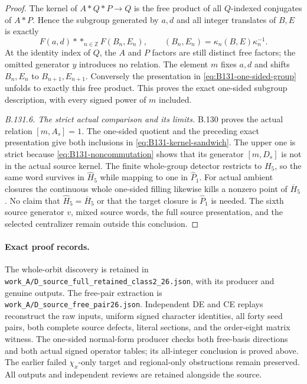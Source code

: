 \begin{proof}
The kernel of $A*Q*P\to Q$ is the free product of all $Q$-indexed
conjugates of $A*P$. Hence the subgroup generated by $a,d$ and all
integer translates of $B,E$ is exactly
\[
 F(a,d)*\mathop{*}_{n\in\mathbb Z}F(B_n,E_n),\qquad
 (B_n,E_n)=\kappa_n(B,E)\kappa_n^{-1}.
\]
At the identity index of $Q$, the $A$ and $P$ factors are still distinct free factors;
the omitted generator $y$ introduces no relation. The element $m$
fixes $a,d$ and shifts $B_n,E_n$ to $B_{n+1},E_{n+1}$. Conversely the
presentation in \eqref{eq:B131-one-sided-group} unfolds to exactly this
free product. This proves the exact one-sided subgroup description,
with every signed power of $m$ included.

\emph{B.131.6. The strict actual comparison and its limits.}
B.130 proves the actual relation $[m,A_s]=1$. The one-sided quotient
and the preceding exact presentation give both inclusions in
\eqref{eq:B131-kernel-sandwich}. The upper one is strict because
\eqref{eq:B131-noncommutation} shows that its generator $[m,D_s]$
is not in the actual source kernel.
The finite whole-group detector restricts to $H_5$, so the same word
survives in $\widehat H_5$ while mapping to one in $\widehat P_1$.
For actual ambient closures the continuous whole one-sided filling
likewise kills a nonzero point of $\overline H_5$. No claim that
$\widehat H_5=\overline H_5$ or that the target closure is
$\widehat P_1$ is needed. The sixth source generator $v$, mixed source
words, the full source presentation, and the selected centralizer
remain outside this conclusion.
\end{proof}

\paragraph{Exact proof records.}
The whole-orbit discovery is retained in
\texttt{work\_A/D\_source\_full\_retained\_class2\_26.json}, with
its producer and genuine outputs. The free-pair extraction is
\texttt{work\_A/D\_source\_free\_pair26.json}. Independent DE and CE
replays reconstruct the raw inputs, uniform signed character identities,
all forty seed pairs, both complete source defects, literal sections,
and the order-eight matrix witness. The one-sided normal-form producer
checks both free-basis directions and both actual signed operator tables;
its all-integer conclusion is proved above. The earlier failed
$\chi_x$-only target and regional-only obstructions remain preserved.
All outputs and independent reviews are retained alongside the source.
